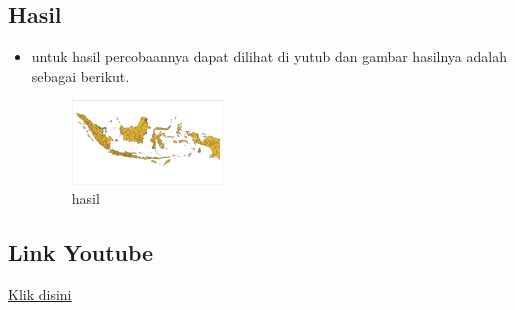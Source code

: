 \subsection{Hasil}
\begin{itemize}
\item untuk hasil percobaannya dapat dilihat di yutub dan gambar hasilnya adalah sebagai berikut.
  \begin{figure}[H]
		\includegraphics[width=4cm]{figures/1174009/4/gis.png}
		\centering
		\caption{hasil}
    \end{figure}
\end{itemize}


\subsection{Link Youtube}
\href{https://youtu.be/FNY0D3eaa2w}{Klik disini}